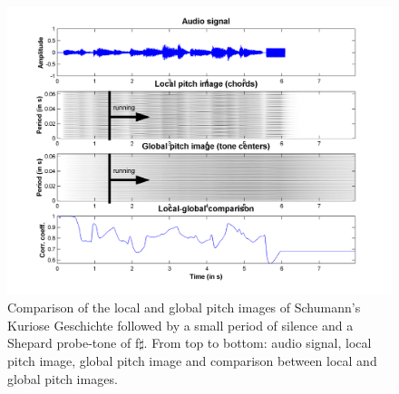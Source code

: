 \begin{figure}[h]
    \centering
    \includegraphics[width=\IPEMDefaultFigureWidth]{Graphics/ContextualityLocalGlobalComparison}
    \caption{Comparison of the local and global pitch images of
    Schumann's Kuriose Geschichte followed by a small period of
    silence and a Shepard probe-tone of f$\sharp$. From top to
    bottom: audio signal, local pitch image, global pitch image
    and comparison between local and global pitch images.}
    \label{Fig:ContextualityLocalGlobalComparison}
\end{figure}
